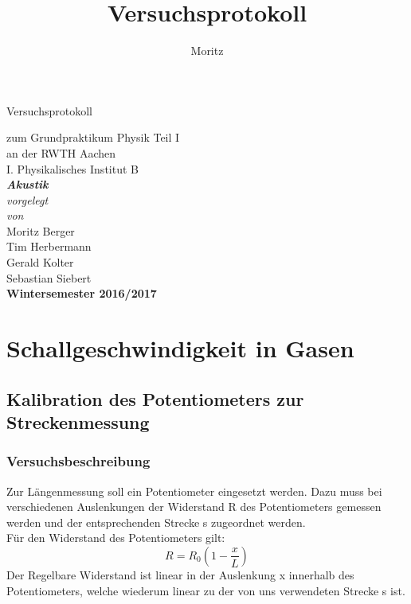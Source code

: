 \documentclass[12pt,a4paper]{article}
\author{Moritz}
\begin{document}
	




\thispagestyle{empty}
\begin{center}
{\LARGE Versuchsprotokoll}\\
\begin{large}
zum Grundpraktikum Physik Teil I\\[0.4cm]
an der RWTH Aachen\\
I. Physikalisches Institut B\\[4.5cm]
\Large\textbf{\textsl{Akustik}}\\[4cm]
\normalsize\textit{vorgelegt\\von}\\[0.4cm]
\large{Moritz Berger\\Tim Herbermann\\Gerald Kolter\\Sebastian Siebert}\\[3cm]
\large \textbf{Wintersemester 2016/2017}
\end{large}
\end{center}

\newpage
\thispagestyle{empty}





\title{Versuchsprotokoll}
\tableofcontents
\newpage
\section{Schallgeschwindigkeit in Gasen}
	\subsection{Kalibration des Potentiometers zur Streckenmessung}
	\label{section:Kalibration_Poti}
	\subsubsection{Versuchsbeschreibung}
	Zur Längenmessung soll ein Potentiometer eingesetzt werden. Dazu muss bei verschiedenen Auslenkungen der Widerstand R des Potentiometers gemessen werden und der entsprechenden Strecke s zugeordnet werden.\\
	
	Für den Widerstand des Potentiometers gilt:
	\begin{equation}
	R = R_0(1-\frac{x}{L})
	\end{equation}
	Der Regelbare Widerstand ist linear in der Auslenkung x innerhalb des Potentiometers, welche wiederum linear zu der von uns verwendeten Strecke s ist.\\
	
\end{document}

